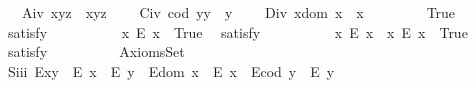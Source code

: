 \begin{isabellebody}
\ \ \ A\isactrlsub i\isactrlsub v{\isacharcolon}\ {\isachardoublequoteopen}x{\isasymcdot}{\isacharparenleft}y{\isasymcdot}z{\isacharparenright}\ {\isasymcong}\ {\isacharparenleft}x{\isasymcdot}y{\isacharparenright}{\isasymcdot}z{\isachardoublequoteclose}\ \isanewline
\ \ \ C\isactrlsub i\isactrlsub v{\isacharcolon}\ {\isachardoublequoteopen}{\isacharparenleft}cod\ y{\isacharparenright}{\isasymcdot}y\ {\isasymcong}\ y{\isachardoublequoteclose}\ \isanewline
\ \ \ D\isactrlsub i\isactrlsub v{\isacharcolon}\ {\isachardoublequoteopen}x{\isasymcdot}{\isacharparenleft}dom\ x{\isacharparenright}\ {\isasymcong}\ x{\isachardoublequoteclose}\ \isanewline
\ \ \isanewline
\ \ \ \isamarkupfalse%
\ True\ \isamarkupfalse%
\ {\isacharbrackleft}satisfy{\isacharbrackright}%
\isadelimproof
\ %
\endisadelimproof
%
\isatagproof
{}\isamarkupfalse%
\ \ %
%
\endisatagproof
{\isafoldproof}%
%
\isadelimproof
%
\endisadelimproof
\isanewline
\ \ \ \isamarkupfalse%
\ \ {\isachardoublequoteopen}{\isasymexists}x{\isachardot}\ \isactrlbold {\isasymnot}{\isacharparenleft}E\ x{\isacharparenright}{\isachardoublequoteclose}\ \ True\ \isamarkupfalse%
\ {\isacharbrackleft}satisfy{\isacharbrackright}%
\isadelimproof
\ %
\endisadelimproof
%
\isatagproof
{}\isamarkupfalse%
\ \ %
%
\endisatagproof
{\isafoldproof}%
%
\isadelimproof
%
\endisadelimproof
\isanewline
\ \ \ \isamarkupfalse%
\ \ {\isachardoublequoteopen}{\isacharparenleft}{\isasymexists}x{\isachardot}\ \isactrlbold {\isasymnot}{\isacharparenleft}E\ x{\isacharparenright}{\isacharparenright}\ {\isasymand}\ {\isacharparenleft}{\isasymexists}x{\isachardot}\ {\isacharparenleft}E\ x{\isacharparenright}{\isacharparenright}{\isachardoublequoteclose}\ \ True\ \isamarkupfalse%
\ {\isacharbrackleft}satisfy{\isacharbrackright}%
\isadelimproof
\ %
\endisadelimproof
%
\isatagproof
{}\isamarkupfalse%
\ \ %
%
\endisatagproof
{\isafoldproof}%
%
\isadelimproof
%
\endisadelimproof
\isanewline
\ \ \isamarkupfalse%
%
\isamarkuptrue%
\ \isamarkupfalse%
\ AxiomsSet{}\isanewline
\ \ \isanewline
\ \ \ \isamarkupfalse%
\ S\isactrlsub i\isactrlsub i\isactrlsub i{\isacharcolon}\ {\isachardoublequoteopen}{\isacharparenleft}E{\isacharparenleft}x{\isasymcdot}y{\isacharparenright}\ \isactrlbold {\isasymrightarrow}\ {\isacharparenleft}E\ x\ \isactrlbold {\isasymand}\ E\ y{\isacharparenright}{\isacharparenright}\ \isactrlbold {\isasymand}\ {\isacharparenleft}E{\isacharparenleft}dom\ x{\isacharparenright}\ \isactrlbold {\isasymrightarrow}\ E\ x{\isacharparenright}\ \isactrlbold {\isasymand}\ {\isacharparenleft}E{\isacharparenleft}cod\ y{\isacharparenright}\ \isactrlbold {\isasymrightarrow}\ E\ y{\isacharparenright}{\isachardoublequoteclose}%

\end{isabellebody}
